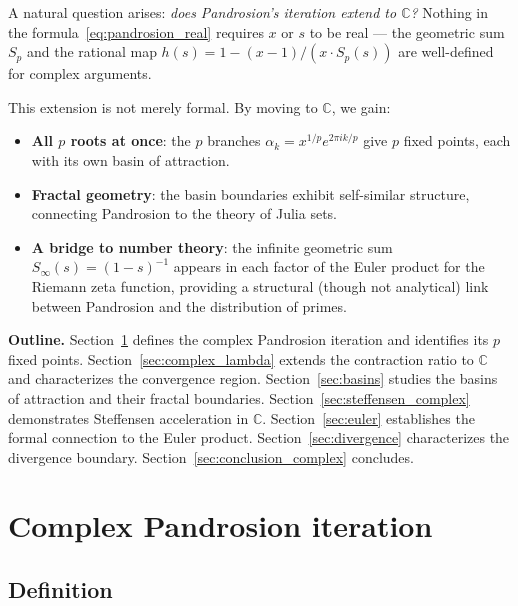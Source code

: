 \documentclass[10pt,a4paper,oneside]{book}
\theoremstyle{definition}
\theoremstyle{remark}
\newcommand{\CC}{\mathbb{C}}
\begin{document}
\medskip

A natural question arises: \emph{does Pandrosion's iteration extend to $\CC$?}  Nothing in the formula~\eqref{eq:pandrosion_real} requires $x$ or $s$ to be real --- the geometric sum $S_p$ and the rational map $h(s) = 1 - (x-1)/(x \cdot S_p(s))$ are well-defined for complex arguments.

\medskip

This extension is not merely formal.  By moving to $\CC$, we gain:
\begin{itemize}
  \item \textbf{All $p$ roots at once}: the $p$ branches $\alpha_k = x^{1/p} e^{2\pi ik/p}$ give $p$ fixed points, each with its own basin of attraction.
  \item \textbf{Fractal geometry}: the basin boundaries exhibit self-similar structure, connecting Pandrosion to the theory of Julia sets.
  \item \textbf{A bridge to number theory}: the infinite geometric sum $S_\infty(s) = (1-s)^{-1}$ appears in each factor of the Euler product for the Riemann zeta function, providing a structural (though not analytical) link between Pandrosion and the distribution of primes.
\end{itemize}

\medskip

\textbf{Outline.}
Section~\ref{sec:complex_iteration} defines the complex Pandrosion iteration and identifies its $p$ fixed points.
Section~\ref{sec:complex_lambda} extends the contraction ratio to $\CC$ and characterizes the convergence region.
Section~\ref{sec:basins} studies the basins of attraction and their fractal boundaries.
Section~\ref{sec:steffensen_complex} demonstrates Steffensen acceleration in $\CC$.
Section~\ref{sec:euler} establishes the formal connection to the Euler product.
Section~\ref{sec:divergence} characterizes the divergence boundary.
Section~\ref{sec:conclusion_complex} concludes.

\section{Complex Pandrosion iteration}
\label{sec:complex_iteration}

\subsection{Definition}
\end{document}
